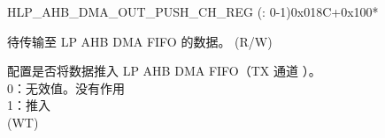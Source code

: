 \begin{register}{H}{LP\_AHB\_DMA\_OUT\_PUSH\_CH\_REG (: 0-1)}{0x018C+0x100*}\label{regdesc:LPAHBDMAOUTPUSHCHNREG}
%
%
%
\regnewline%
\begin{regdesc}\begin{reglist}
\label{fielddesc:LPAHBDMAOUTFIFOWDATACHN}\item [LP\_AHB\_DMA\_OUTFIFO\_WDATA\_CH\regindex{n}] 待传输至 LP AHB DMA FIFO 的数据。 (R/W)
\label{fielddesc:LPAHBDMAOUTFIFOPUSHCHN}\item [LP\_AHB\_DMA\_OUTFIFO\_PUSH\_CH\regindex{n}] 配置是否将数据推入 LP AHB DMA FIFO（TX 通道 ）。\\0：无效值。没有作用\\1：推入\\ (WT)
\end{reglist}\end{regdesc}
\end{register}


